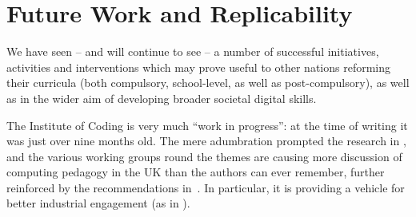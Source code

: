 \documentclass[sigconf]{acmart}
\begin{document}



\section{Future Work and Replicability}\label{concl}

We have seen -- and will continue to see -- a number of successful
initiatives, activities and interventions which may prove useful to
other nations reforming their curricula (both compulsory,
school-level, as well as post-compulsory), as well as in the wider aim
of developing broader societal digital skills.


The Institute of Coding is very much ``work in progress'': at the time
of writing it was just over nine months old.  The mere adumbration
prompted the research in
\cite{murphy-et-al:programming2017}, and the various working groups
round the themes are causing more discussion of computing pedagogy in
the UK than the authors can ever remember, further reinforced by the
recommendations in~\cite{rs:2017}. In particular, it is providing a vehicle for better industrial engagement (as in \cite{Chapman2018c}).
\end{document}
